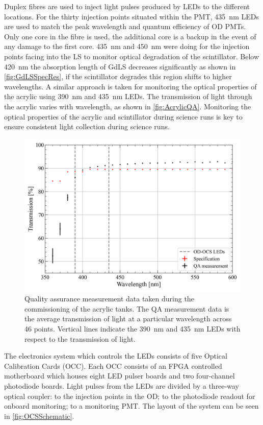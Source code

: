 Duplex fibres are used to inject light pulses produced by LEDs to the different locations. For the thirty injection points situated within the PMT, 435~nm LEDs are used to match the peak wavelength and quantum efficiency of OD PMTs. Only one core in the fibre is used, the additional core is a backup in the event of any damage to the first core. 435~nm and 450~nm were doing for the injection points facing into the LS to monitor optical degradation of the scintillator. Below 420~nm the absorption length of GdLS decreases significantly as shown in \autoref{fig:GdLSSpecRes}, if the scintillator degrades this region shifts to higher wavelengths. A similar approach is taken for monitoring the optical properties of the acrylic using 390~nm and 435~nm LEDs. The transmission of light through the acrylic varies with wavelength, as shown in \autoref{fig:AcrylicQA}. Monitoring the optical properties of the acrylic and scintillator during science runs is key to ensure consistent light collection during science runs.
\begin{figure}[h!]
    \centering
    \includegraphics[width=0.8\linewidth]{figures/LZ/T187-XDM-UVT_WAVELENGHT_08252017.png}
    \caption{Quality assurance measurement data taken during the commissioning of the acrylic tanks. The QA measurement data is the average transmission of light at a particular wavelength across 46 points. Vertical lines indicate the 390~nm and 435~nm LEDs with respect to the transmission of light.}
    \label{fig:AcrylicQA}
\end{figure}
The electronics system which controls the LEDs consists of five Optical Calibration Cards (OCC). Each OCC consists of an FPGA controlled motherboard which houses eight LED pulser boards and two four-channel photodiode boards. Light pulses from the LEDs are divided by a three-way optical coupler: to the injection points in the OD; to the photodiode readout for onboard monitoring; to a monitoring PMT. The layout of the system can be seen in \autoref{fig:OCSSchematic}.
